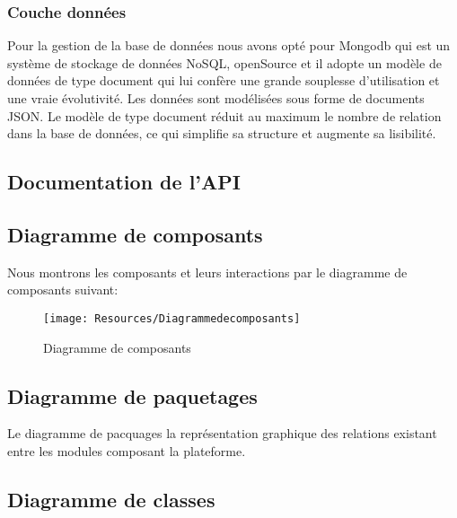 \subsubsection{Couche données}
Pour la gestion de la base de données nous avons opté pour Mongodb qui est un système de stockage de données NoSQL, openSource et il adopte un modèle de données de type document qui lui confère une grande souplesse d’utilisation et une vraie évolutivité. Les données sont modélisées sous forme de documents JSON. Le modèle de type document réduit au maximum le nombre de relation dans la base de données, ce qui simplifie sa structure et augmente sa lisibilité.
\subsection{Documentation de l'API}
\subsection{Diagramme de composants}
Nous montrons les composants et leurs interactions par le diagramme de composants suivant:
\begin{figure}[H]
	\centering
	\texttt{[image: Resources/Diagrammedecomposants]}
	\caption{Diagramme de composants}
	\label{diagramcomposants}
\end{figure}
\subsection{Diagramme de paquetages}
Le diagramme de pacquages la représentation graphique des relations existant entre les modules composant la plateforme.

\subsection{Diagramme de classes}


